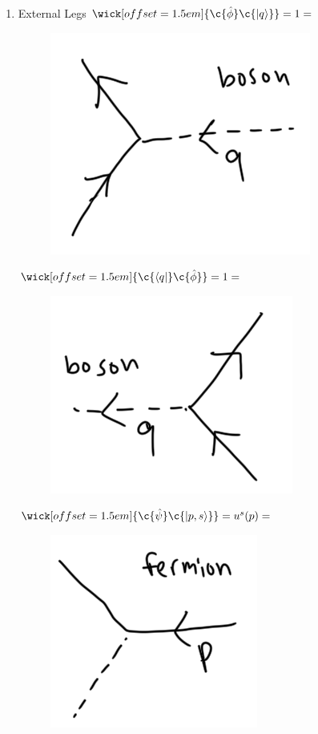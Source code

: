 \begin{enumerate}
\item External Legs
	\subitem $\wick[offset=1.5em]{\c {\hat{\phi}} \c {\ket{q}}} = 1 = $ \begin{figure}[H]\centering \includegraphics[scale=0.5]{bosonket.png}  \end{figure}
	\subitem $\wick[offset=1.5em]{\c {\bra{q}} \c {\hat{\phi}}} = 1 = $ \begin{figure}[H]\centering \includegraphics[scale=0.5]{bosonbra.png}  \end{figure}
	\subitem $\wick[offset=1.5em]{\c {\hat{\psi}} \c {\ket{p,s}}} = u^s (p) = $ \begin{figure}[H]\centering \includegraphics[scale=0.5]{fermionket.png}  \end{figure}

\end{enumerate}

